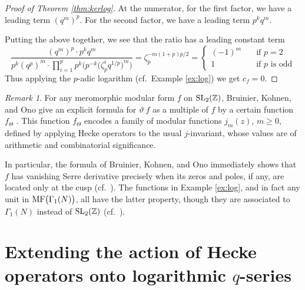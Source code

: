 \documentclass{gtpart}
\theoremstyle{definition}
\theoremstyle{remark}
\newtheorem{rmk}[thm]{Remark}
\newcommand{\mb}[1]{\mathbb{#1}}
\newcommand{\BZ}{{\mb Z}}
\newcommand{\MF}{{\rm MF}}
\newcommand{\G}{\Gamma}
\renewcommand{\=}{\approx}
\renewcommand{\-}{\sim}
\newcommand{\SL}{{\rm SL}}
\numberwithin{equation}{section}
\numberwithin{thm}{section}
\begin{document}
\begin{proof}[Proof of Theorem \ref{thm:kerlog}]
 At the numerator, for the first factor, we have a leading term $(q^m)^p$.  
 For the second factor, we have a leading term $p^k q^m$.  

 Putting the above together, we see that the ratio has a leading constant term 
 \[
  \frac{(q^m)^p \cdot p^k q^m}{p^k (q^p)^m \cdot \prod_{i=1}^p p^k \Big( p^{-k} \big( \zeta_p^i q^{1/p} \big)^m \Big)} = \zeta_p^{-m (1 + p) p / 2} = \left\{\!\!
  \begin{array}{ll}
    (-1)^m & \quad \text{if $p = 2$} \\
    1 & \quad \text{if $p$ is odd} 
  \end{array}
  \right.
\]
Thus applying the $p$-adic logarithm (cf.~Example \ref{ex:log}) we get $c_f = 0$.  
\end{proof}

\begin{rmk}
 \label{rmk:kertheta}
 For any meromorphic modular form $f$ on $\SL_2(\BZ)$, 
 Bruinier, Kohnen, and Ono give an explicit formula for $\vartheta ~\! f$ as a multiple of $f$ by a certain function $f_\Theta$ \cite[Theorem 1]{BKO}.  
 This function $f_\Theta$ encodes a family of modular functions $j_m(z)$, $m \geq 0$, defined by applying Hecke operators to the usual $j$-invariant, 
 whose values are of arithmetic and combinatorial significance.  

 In particular, the formula of Bruinier, Kohnen, and Ono immediately shows 
 that $f$ has vanishing Serre derivative 
 precisely when its zeros and poles, if any, are located only at the cusp 
 (cf.~\cite[Proposition 6]{DumasRoyer}).  
 The functions in Example \ref{ex:log}, and in fact any unit in $\MF\big(\G_1(N)\big)$, all have the latter property, 
 though they are associated to $\G_1(N)$ instead of $\SL_2(\BZ)$ 
 (cf.~\cite[Remark 2.17]{web}).  
\end{rmk}



\section{Extending the action of Hecke operators onto logarithmic $q$-series}
\label{sec:logq}
\end{document}
